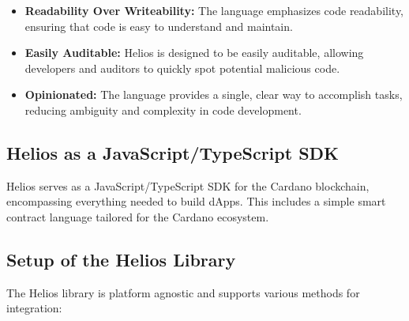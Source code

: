 \begin{itemize}
    \item \textbf{Readability Over Writeability:} The language emphasizes code readability, ensuring that code is easy to understand and maintain.
    \item \textbf{Easily Auditable:} Helios is designed to be easily auditable, allowing developers and auditors to quickly spot potential malicious code.
    \item \textbf{Opinionated:} The language provides a single, clear way to accomplish tasks, reducing ambiguity and complexity in code development.
\end{itemize}

\subsection{Helios as a JavaScript/TypeScript SDK}

Helios serves as a JavaScript/TypeScript SDK for the Cardano blockchain, encompassing everything needed to build dApps. This includes a simple smart contract language tailored for the Cardano ecosystem.

\subsection{Setup of the Helios Library}

The Helios library is platform agnostic and supports various methods for integration:

